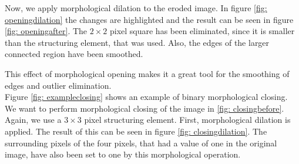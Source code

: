 \documentclass[a4paper,12pt]{article}
\theoremstyle{plain}
\theoremstyle{definition}
\begin{document}
Now, we apply morphological dilation to the eroded image. In figure \ref{fig: openingdilation} the changes are highlighted and the result can be seen in figure \ref{fig: openingafter}. The $2 \times 2$ pixel square has been eliminated, since it is smaller than the structuring element, that was used. Also, the edges of the larger connected region have been smoothed.

This effect of morphological opening makes it a great tool for the smoothing of edges and outlier elimination.\\


Figure \ref{fig: exampleclosing} shows an example of binary morphological closing. We want to perform morphological closing of the image in \ref{fig: closingbefore}. Again, we use a $3 \times 3$ pixel structuring element. First, morphological dilation is applied. The result of this can be seen in figure \ref{fig: closingdilation}. The surrounding pixels of the four pixels, that had a value of one in the original image, have also been set to one by this morphological operation.
\end{document}
